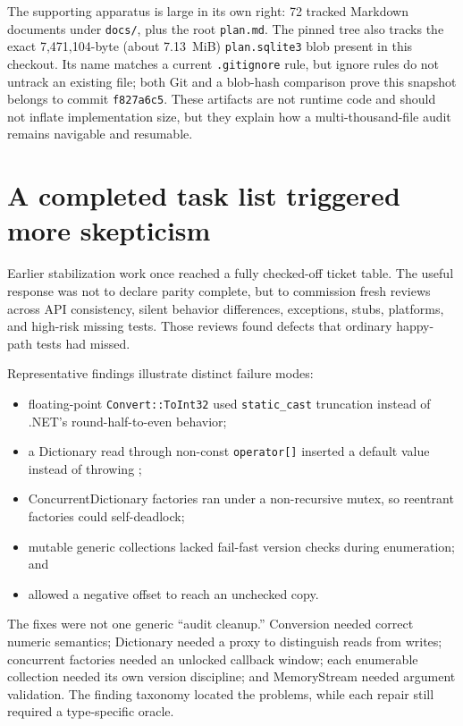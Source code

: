 The supporting apparatus is large in its own right: 72 tracked Markdown documents under
\texttt{docs/}, plus the root \texttt{plan.md}.  The pinned tree also tracks the exact
7{,}471{,}104-byte (about 7.13~MiB) \texttt{plan.sqlite3} blob present in this checkout. Its name
matches a current \texttt{.gitignore} rule, but ignore rules do not untrack an existing file; both
Git and a blob-hash comparison prove this snapshot belongs to commit \texttt{f827a6c5}. These
artifacts are not runtime code and should not inflate implementation size, but they explain how a
multi-thousand-file audit remains navigable and resumable.

\section{A completed task list triggered more skepticism}

Earlier stabilization work once reached a fully checked-off ticket table. The useful response
was not to declare parity complete, but to commission fresh reviews across API consistency,
silent behavior differences, exceptions, stubs, platforms, and high-risk missing tests. Those
reviews found defects that ordinary happy-path tests had missed.

Representative findings illustrate distinct failure modes:

\begin{itemize}
  \item floating-point \texttt{Convert::ToInt32} used \texttt{static\_cast} truncation instead
        of .NET's round-half-to-even behavior;
  \item a Dictionary read through non-const \texttt{operator[]} inserted a default value instead
        of throwing ;
  \item ConcurrentDictionary factories ran under a non-recursive mutex, so reentrant factories
        could self-deadlock;
  \item mutable generic collections lacked fail-fast version checks during enumeration; and
  \item {} allowed a negative offset to reach an unchecked copy.
\end{itemize}

The fixes were not one generic ``audit cleanup.'' Conversion needed correct numeric semantics;
Dictionary needed a proxy to distinguish reads from writes; concurrent factories needed an
unlocked callback window; each enumerable collection needed its own version discipline; and
MemoryStream needed argument validation. The finding taxonomy located the problems, while each
repair still required a type-specific oracle.

